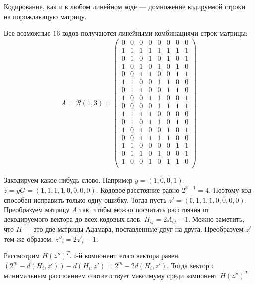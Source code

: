 Кодирование, как и в любом линейном коде --- домножение кодируемой строки на порождающую матрицу.

Все возможные $16$ кодов получаются линейными комбинациями строк матрицы:
$$A = \mathscr{R}(1,3) = \begin{pmatrix}
0 & 0 & 0 & 0 & 0 & 0 & 0 & 0  \\
1 & 1 & 1 & 1 & 1 & 1 & 1 & 1  \\
0 & 1 & 0 & 1 & 0 & 1 & 0 & 1  \\
1 & 0 & 1 & 0 & 1 & 0 & 1 & 0  \\
0 & 0 & 1 & 1 & 0 & 0 & 1 & 1  \\
1 & 1 & 0 & 0 & 1 & 1 & 0 & 0  \\
0 & 1 & 1 & 0 & 0 & 1 & 1 & 0  \\
1 & 0 & 0 & 1 & 1 & 0 & 0 & 1  \\
0 & 0 & 0 & 0 & 1 & 1 & 1 & 1  \\
1 & 1 & 1 & 1 & 0 & 0 & 0 & 0  \\
0 & 1 & 0 & 1 & 1 & 0 & 1 & 0  \\
1 & 0 & 1 & 0 & 0 & 1 & 0 & 1  \\
0 & 0 & 1 & 1 & 1 & 1 & 0 & 0  \\
1 & 1 & 0 & 0 & 0 & 0 & 1 & 1  \\
0 & 1 & 1 & 0 & 1 & 0 & 0 & 1  \\
1 & 0 & 0 & 1 & 0 & 1 & 1 & 0  \\
\end{pmatrix}$$

Закодируем какое-нибудь слово. Например $y = (1,0,0,1)$. $z = y G = (1, 1, 1, 1, 0, 0, 0, 0)$. 
Кодовое расстояние равно $2^{3-1} = 4$. Поэтому код способен исправить только одну ошибку.
Тогда пусть $z' = (0, 1, 1, 1, 0, 0, 0, 0)$. Преобразуем матрицу $A$ так, чтобы можно посчитать
расстояния от декодируемого вектора до всех кодовых слов. $H_{ij} = 2 A_{ij} - 1$. Можно заметить,
что $H$ --- это две матрицы Адамара, поставленные друг на друга. Преобразуем $z'$ тем же образом:
$z''_i = 2 z'_i - 1$. 

Рассмотрим $H (z'')^T$. $i$-й компонент этого вектора равен $(2^m - d(H_i, z')) - d(H_i, z') = 2^m - 2 d(H_i, z')$.
Тогда вектор с минимальным расстоянием соответствует максимуму среди компонент $H (z'')^T$.

